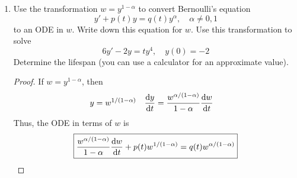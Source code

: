 \documentclass[../psets.tex]{subfiles}
\begin{document}
\begin{enumerate}
\begin{proof}
\begin{equation*}
            \dv{w}{t} = \frac{(-4w^{-1}-w)-w}{t}
        \end{equation*}
        Transforming the initial condition as well gives
        \begin{equation*}
            w(2) = \frac{y(2)}{2} = -\frac{7}{2}
        \end{equation*}
        We can simplify and solve the above as follows.
        \begin{align*}
            \frac{\dd{w}}{-4w^{-1}-2w} &= \frac{\dd{t}}{t}\\
            -\frac{1}{4}\int_{-7/2}^w\frac{2v\dd{v}}{v^2+2} &= \int_2^t\frac{\dd\tau}{\tau}\\
            -\frac{1}{4}\left[ \ln(w^2+2)-\ln(14.25) \right] &= \ln(\frac{t}{2})\\
            w &= \pm\frac{1}{t^2}\sqrt{228-2t^4}\\
            \Aboxed{y(t) &= -\frac{1}{t}\sqrt{228-2t^4}}
        \end{align*}
        Note that we pick the negative in the final step to fit the initial condition.\par
        The initial value of $t$ is 2 by hypothesis. The final value of $t$ can be determined by calculating when $228-2t^4=0$. This occurs such that the interval of existence is approximately $[2,3.27]$ and the lifespan is thus approximately $\boxed{1.27}$.
    \end{proof}
    \item Use the transformation $w=y^{1-\alpha}$ to convert Bernoulli's equation
    \begin{equation*}
        y'+p(t)y = q(t)y^\alpha
        ,\quad
        \alpha\neq 0,1
    \end{equation*}
    to an ODE in $w$. Write down this equation for $w$. Use this transformation to solve
    \begin{equation*}
        6y'-2y = ty^4
        ,\quad
        y(0) = -2
    \end{equation*}
    Determine the lifespan (you can use a calculator for an approximate value).
    \begin{proof}
        If $w=y^{1-\alpha}$, then
        \begin{align*}
            y &= w^{1/(1-\alpha)}&
            \dv{y}{t} &= \frac{w^{\alpha/(1-\alpha)}}{1-\alpha}\dv{w}{t}
        \end{align*}
        Thus, the ODE in terms of $w$ is
        \begin{equation*}
            \boxed{\frac{w^{\alpha/(1-\alpha)}}{1-\alpha}\dv{w}{t}+p(t)w^{1/(1-\alpha)} = q(t)w^{\alpha/(1-\alpha)}}

\end{equation*}
\end{proof}
\end{enumerate}
\end{document}

